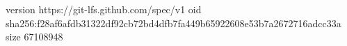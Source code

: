 version https://git-lfs.github.com/spec/v1
oid sha256:f28af6afdb31322df92cb72bd4dfb7fa449b65922608e53b7a2672716adcc33a
size 67108948

